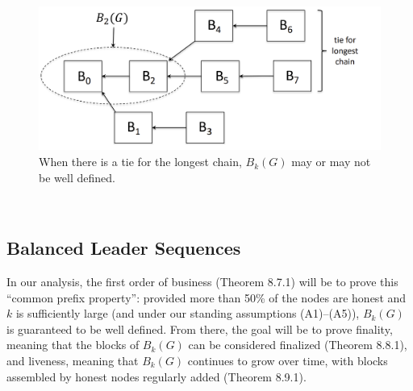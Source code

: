 \begin{figure}[h]
    \centering
    \includegraphics[scale = 0.5]{figures/f27.png}
    \caption{ When there is a tie for the longest chain, $B_k(G)$ may or may not be well defined.
}
    \label{fig:mesh1}
\end{figure}\\

\subsection{Balanced Leader Sequences}
In our analysis, the first order of business (Theorem 8.7.1) will be to prove this “common prefix
property”: provided more than 50\% of the nodes are honest and $k$ is sufficiently large (and
under our standing assumptions (A1)–(A5)), $B_k(G)$ is guaranteed to be well defined. From
there, the goal will be to prove finality, meaning that the blocks of $B_k(G)$ can be considered
finalized (Theorem 8.8.1), and liveness, meaning that $B_k(G)$ continues to grow over time, with
blocks assembled by honest nodes regularly added (Theorem 8.9.1).\\

